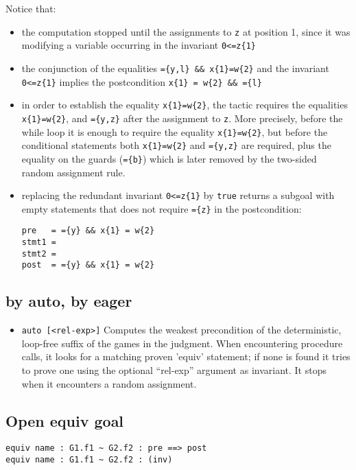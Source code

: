 \noindent
Notice that:
\begin{itemize}
\item the computation stopped until the assignments to \verb+z+ at
  position 1, since it was modifying a variable occurring in the
  invariant \verb+0<=z{1}+
\item the conjunction of the equalities \verb+={y,l} && x{1}=w{2}+ and
  the invariant \verb+0<=z{1}+ implies the postcondition
  \verb+x{1} = w{2} && ={l}+
\item in order to establish the equality \verb+x{1}=w{2}+, the tactic
  requires the equalities \verb+x{1}=w{2}+, and \verb+={y,z}+ after
  the assignment to \verb+z+. More precisely, before the while loop it
  is enough to require the equality \verb+x{1}=w{2}+, but before the
  conditional statements both \verb+x{1}=w{2}+ and \verb+={y,z}+ are
  required, plus the equality on the guards (\verb+={b}+) which is later
  removed by the two-sided random assignment rule.
\item replacing the redundant invariant \verb+0<=z{1}+ by \verb+true+
  returns a subgoal with empty statements that does not require
  \verb+={z}+ in the postcondition:
\begin{verbatim}
pre   = ={y} && x{1} = w{2}
stmt1 = 
stmt2 = 
post  = ={y} && x{1} = w{2}
\end{verbatim}
  
\end{itemize}


\subsection{by auto, by eager}

\begin{itemize}
\item \verb+auto [<rel-exp>]+
%
  Computes the weakest precondition of the deterministic, loop-free
  suffix of the games in the judgment. When encountering procedure
  calls, it looks for a matching proven 'equiv' statement; if none is
  found it tries to prove one using the optional ``rel-exp'' argument as
  invariant. It stops when it encounters a random assignment.

\end{itemize}

\subsection{Open equiv goal}

\begin{verbatim}
equiv name : G1.f1 ~ G2.f2 : pre ==> post
equiv name : G1.f1 ~ G2.f2 : (inv)
\end{verbatim}

